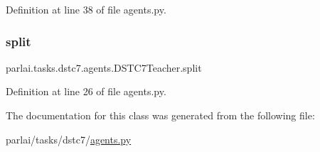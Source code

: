 Definition at line 38 of file agents.\+py.

\mbox{\label{classparlai_1_1tasks_1_1dstc7_1_1agents_1_1DSTC7Teacher_a441e080f8a4514fb9c3b8a1872dea4e3}} 
\subsubsection{\texorpdfstring{split}{split}}
{\footnotesize\ttfamily parlai.\+tasks.\+dstc7.\+agents.\+D\+S\+T\+C7\+Teacher.\+split}



Definition at line 26 of file agents.\+py.



The documentation for this class was generated from the following file\+:\begin{DoxyCompactItemize}
\item 
parlai/tasks/dstc7/\hyperlink{parlai_2tasks_2dstc7_2agents_8py}{agents.\+py}\end{DoxyCompactItemize}
